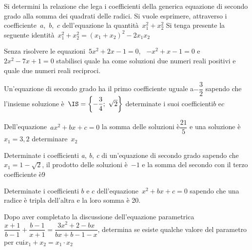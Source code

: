 \begin{esercizio}
 \label{ese:3.70}
Si determini la relazione che lega i coefficienti della generica equazione 
di secondo grado alla somma dei quadrati delle radici. Si vuole esprimere,
attraverso i coefficiente~$a$,~$b$,~$c$ dell'equazione la 
quantità~$x_{1}^{2} + x_{2}^{2}$ 
Si tenga presente la seguente identità~$x_{1}^{2} + x_{2}^{2} = 
(x_{1} + x_{2} )^{2}-2 x_{1} x_{2}$
\end{esercizio}

\begin{esercizio}
 \label{ese:3.71}
Senza risolvere le equazioni~$5 x^{2} + 2 x-1 = 0$, 
~$-x^{2} + x-1 = 0$ e~$2 x^{2}-7 x +1 = 0$ stabilisci quale ha come 
soluzioni due numeri reali positivi e quale due numeri reali reciproci.
\end{esercizio}

\begin{esercizio}
 \label{ese:3.72}
Un'equazione di secondo grado ha il primo coefficiente uguale a$- 
\dfrac{3}{2}$ 
sapendo che l'insieme soluzione è~$\IS = \left\{-\dfrac{3}{4};~\sqrt{2} 
\right\}$
determinate i suoi coefficienti$b$ e$c$
\end{esercizio}

\begin{esercizio}
 \label{ese:3.73}
Dell'equazione~$a x^{2} + b x + c = 0$ la somma delle soluzioni 
è$\dfrac{21}{5}$ e una soluzione è~$x_{1} = 3,2$ determinare~$x_{2}$
\end{esercizio}

\begin{esercizio}
 \label{ese:3.74}
Determinate i coefficienti \emph{a}, \emph{b}, \emph{c} di un'equazione di 
secondo grado sapendo che~$x_{1} = 1-\sqrt{2}$, il prodotto delle soluzioni 
è~$-1$ e la somma del secondo con il terzo coefficiente è$9$
\end{esercizio}

\begin{esercizio}
 \label{ese:3.75}
Determinate i coefficienti $b$ e $c$ dell'equazione~$x^{2} + b x + c = 0$ 
sapendo che una radice è tripla dell'altra e la loro somma è 20.
\end{esercizio}

\begin{esercizio}[\Ast]
 \label{ese:3.76}
Dopo aver completato la discussione dell'equazione parametrica$\dfrac{x + 
1}{b-1} + \dfrac{b-1}{x + 1}=\dfrac{3 x^{2} + 2-b x}{b x + b-1-x}$, 
determina se 
esiste qualche valore del parametro per cui$x_{1} + x_{2} = x_{1} \cdot 
x_{2}$
\end{esercizio}

